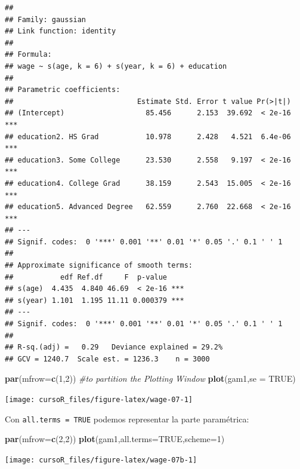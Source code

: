 \documentclass[]{book}
\newenvironment{Shaded}{\begin{snugshade}}{\end{snugshade}}
\newcommand{\KeywordTok}[1]{\textcolor[rgb]{0.13,0.29,0.53}{\textbf{#1}}}
\newcommand{\DataTypeTok}[1]{\textcolor[rgb]{0.13,0.29,0.53}{#1}}
\newcommand{\DecValTok}[1]{\textcolor[rgb]{0.00,0.00,0.81}{#1}}
\newcommand{\CommentTok}[1]{\textcolor[rgb]{0.56,0.35,0.01}{\textit{#1}}}
\newcommand{\OtherTok}[1]{\textcolor[rgb]{0.56,0.35,0.01}{#1}}
\newcommand{\NormalTok}[1]{#1}
\begin{document}
\begin{verbatim}
## 
## Family: gaussian 
## Link function: identity 
## 
## Formula:
## wage ~ s(age, k = 6) + s(year, k = 6) + education
## 
## Parametric coefficients:
##                             Estimate Std. Error t value Pr(>|t|)    
## (Intercept)                   85.456      2.153  39.692  < 2e-16 ***
## education2. HS Grad           10.978      2.428   4.521  6.4e-06 ***
## education3. Some College      23.530      2.558   9.197  < 2e-16 ***
## education4. College Grad      38.159      2.543  15.005  < 2e-16 ***
## education5. Advanced Degree   62.559      2.760  22.668  < 2e-16 ***
## ---
## Signif. codes:  0 '***' 0.001 '**' 0.01 '*' 0.05 '.' 0.1 ' ' 1
## 
## Approximate significance of smooth terms:
##           edf Ref.df     F  p-value    
## s(age)  4.435  4.840 46.69  < 2e-16 ***
## s(year) 1.101  1.195 11.11 0.000379 ***
## ---
## Signif. codes:  0 '***' 0.001 '**' 0.01 '*' 0.05 '.' 0.1 ' ' 1
## 
## R-sq.(adj) =   0.29   Deviance explained = 29.2%
## GCV = 1240.7  Scale est. = 1236.3    n = 3000
\end{verbatim}

\begin{Shaded}
\begin{Highlighting}[]
\KeywordTok{par}\NormalTok{(}\DataTypeTok{mfrow=}\KeywordTok{c}\NormalTok{(}\DecValTok{1}\NormalTok{,}\DecValTok{2}\NormalTok{)) }\CommentTok{#to partition the Plotting Window}
\KeywordTok{plot}\NormalTok{(gam1,}\DataTypeTok{se =} \OtherTok{TRUE}\NormalTok{)}
\end{Highlighting}
\end{Shaded}

\begin{center}\texttt{[image: cursoR\_files/figure-latex/wage-07-1]} \end{center}

Con \texttt{all.terms\ =\ TRUE} podemos representar la parte
paramétrica:

\begin{Shaded}
\begin{Highlighting}[]
\KeywordTok{par}\NormalTok{(}\DataTypeTok{mfrow=}\KeywordTok{c}\NormalTok{(}\DecValTok{2}\NormalTok{,}\DecValTok{2}\NormalTok{))}
\KeywordTok{plot}\NormalTok{(gam1,}\DataTypeTok{all.terms=}\OtherTok{TRUE}\NormalTok{,}\DataTypeTok{scheme=}\DecValTok{1}\NormalTok{)}
\end{Highlighting}
\end{Shaded}

\begin{center}\texttt{[image: cursoR\_files/figure-latex/wage-07b-1]} \end{center}
\end{document}
